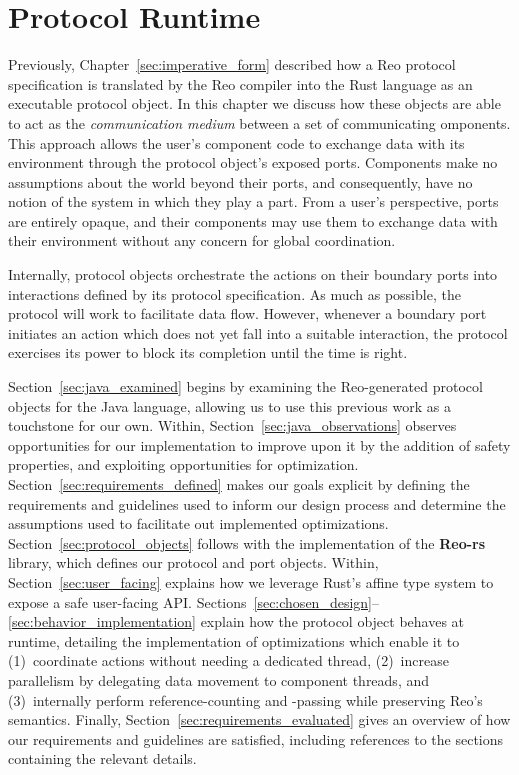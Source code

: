 \chapter{Protocol Runtime}
\label{sec:protocol_runtime}
Previously, Chapter~\ref{sec:imperative_form} described how a Reo protocol specification is translated by the Reo compiler into the Rust language as an executable protocol object. In this chapter we discuss how these objects are able to act as the \textit{communication medium} between a set of communicating omponents. This approach allows the user's component code to exchange data with its environment through the protocol object's exposed ports. Components make no assumptions about the world beyond their ports, and consequently, have no notion of the system in which they play a part. From a user's perspective, ports are entirely opaque, and their components may use them to exchange data with their environment without any concern for global coordination.

Internally, protocol objects orchestrate the actions on their boundary ports into interactions defined by its protocol specification. As much as possible, the protocol will work to facilitate data flow. However, whenever a boundary port initiates an action which does not yet fall into a suitable interaction, the protocol exercises its power to block its completion until the time is right. 

Section~\ref{sec:java_examined} begins by examining the Reo-generated protocol objects for the Java language, allowing us to use this previous work as a touchstone for our own. Within, Section~\ref{sec:java_observations} observes opportunities for our implementation to improve upon it by the addition of safety properties, and exploiting opportunities for optimization. Section~\ref{sec:requirements_defined} makes our goals explicit by defining the requirements and guidelines used to inform our design process and determine the assumptions used to facilitate out implemented optimizations.  Section~\ref{sec:protocol_objects} follows with the implementation of the \textbf{Reo-rs} library, which defines our protocol and port objects. Within, Section~\ref{sec:user_facing} explains how we leverage Rust's affine type system to expose a safe user-facing API. Sections~\ref{sec:chosen_design}--\ref{sec:behavior_implementation} explain how the protocol object behaves at runtime, detailing the implementation of optimizations which enable it to (1)~coordinate actions without needing a dedicated thread, (2)~increase parallelism by delegating data movement to component threads, and (3)~internally perform reference-counting and -passing while preserving Reo's semantics. Finally, Section~\ref{sec:requirements_evaluated} gives an overview of how our requirements and guidelines are satisfied, including references to the sections containing the relevant details.

